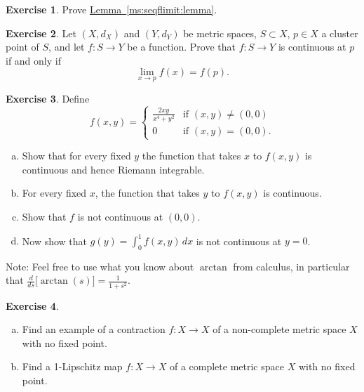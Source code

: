 \documentclass[12pt,openany]{book}
\theoremstyle{plain}
\theoremstyle{remark}
\theoremstyle{definition}
\newenvironment{exbox}{%
    \def\FrameCommand{\vrule width 1pt \relax\hspace {10pt}}%
    \MakeFramed {\advance \hsize -\width \FrameRestore }%
}{%
    \endMakeFramed
}
\newenvironment{exparts}{%
    \leavevmode\begin{enumerate}[a),noitemsep,topsep=0pt,parsep=0pt,partopsep=0pt]
}{%
    \end{enumerate}
}
\theoremstyle{exercise}
\newtheorem{exercise}{Exercise}[section]
\theoremstyle{example}
\newcommand{\lemmaref}[1]{\hyperref[#1]{Lemma~\ref*{#1}}}
\begin{document}
\begin{exbox}
\begin{exercise}
Prove \lemmaref{ms:seqflimit:lemma}.
\end{exercise}

\begin{exercise}
Let $(X,d_X)$ and $(Y,d_Y)$ be metric spaces, $S \subset X$, $p \in X$
a cluster point of $S$, and let $f \colon S \to Y$ be a function.
Prove that
$f \colon S \to Y$ is continuous at $p$ if and only if
\begin{equation*}
\lim_{x \to p} f(x) = f(p) .
\end{equation*}
\end{exercise}

\begin{exercise}
Define
\begin{equation*}
f(x,y) =
\begin{cases}
\frac{2xy}{x^4+y^2} & \text{if } (x,y) \not= (0,0) \\
0 & \text{if } (x,y) = (0,0) .
\end{cases}
\end{equation*}
\begin{exparts}
\item
Show that for every fixed $y$ the function that takes $x$ to $f(x,y)$
is continuous and hence Riemann integrable.
\item
For every fixed $x$, the function that takes $y$ to $f(x,y)$ is continuous.
\item
Show that $f$ is not continuous at $(0,0)$.
\item
Now show that $g(y) = \int_0^1 f(x,y)\,dx$ is not continuous at $y=0$.
\end{exparts}
Note: Feel free to use what you know about $\arctan$ from calculus,
in particular that $\frac{d}{ds} \bigl[ \arctan(s) \bigr] = \frac{1}{1+s^2}$.
\end{exercise}

\begin{exercise} \label{exercise:nofixedpoint}
\begin{exparts}
\item
Find an example of a contraction $f \colon X \to X$
of a non-complete metric space $X$ with no
fixed point.
\item
Find a 1-Lipschitz map $f \colon X \to X$ of a complete metric space $X$ with no fixed point.
\end{exparts}
\end{exercise}
\end{exbox}

\end{document}
